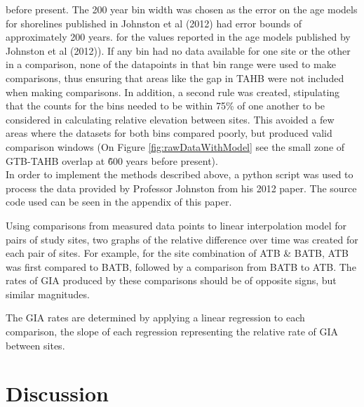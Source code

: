 \documentclass{article}
\begin{document}
 before present. The 200 year bin width was chosen as the error on the age models
 for shorelines published in Johnston et al (2012) had error bounds of approximately
 200 years.
 for the values reported in the age models published by Johnston et al (2012)). If any bin had no data
 available for one site or the other in a comparison, none of the datapoints in
 that bin range were used to make comparisons, thus ensuring that areas like the
 gap in TAHB were not included when making comparisons. In addition, a second rule
 was created, stipulating that the counts for the bins needed to be within 75\% of one another to be considered
 in calculating relative elevation between sites. This
 avoided a few areas where the datasets for both bins compared poorly,
 but produced valid comparison windows (On Figure \ref{fig:rawDataWithModel} see the small zone of GTB-TAHB overlap
 at \~ 600 years before present).\\
 In order to implement the methods described above, a python script was used to
 process the data provided by Professor Johnston from his 2012 paper. The source
 code used can be seen in the appendix of this paper.
 
 Using comparisons from measured data points to linear interpolation model for
 pairs of study sites,
 two graphs of the relative difference over time was created for each pair
 of sites. For example, for
 the site combination of ATB \& BATB, ATB was first compared to BATB, followed 
 by a comparison from BATB to ATB. The rates of GIA produced by these comparisons
 should be of opposite signs, but similar magnitudes.
 
 The GIA rates are determined by applying a linear regression to each comparison,
 the slope of each regression representing the relative rate of GIA between sites.

\newpage

\section{Discussion}



\end{document}
